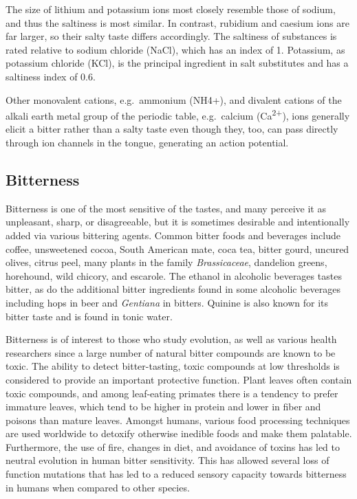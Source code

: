 The size of lithium and potassium ions most closely resemble those of sodium, and thus the saltiness is most similar. In contrast, rubidium and caesium ions are far larger, so their salty taste differs accordingly. The saltiness of substances is rated relative to sodium chloride (NaCl), which has an index of 1. Potassium, as potassium chloride (KCl), is the principal ingredient in salt substitutes and has a saltiness index of 0.6.

Other monovalent cations, e.g.~ammonium (NH4+), and divalent cations of the alkali earth metal group of the periodic table, e.g.~calcium (Ca\textsuperscript{2+}), ions generally elicit a bitter rather than a salty taste even though they, too, can pass directly through ion channels in the tongue, generating an action potential.

\hypertarget{bitterness}{%
\subsection{Bitterness}\label{bitterness}}

Bitterness is one of the most sensitive of the tastes, and many perceive it as unpleasant, sharp, or disagreeable, but it is sometimes desirable and intentionally added via various bittering agents. Common bitter foods and beverages include coffee, unsweetened cocoa, South American mate, coca tea, bitter gourd, uncured olives, citrus peel, many plants in the family \emph{Brassicaceae}, dandelion greens, horehound, wild chicory, and escarole. The ethanol in alcoholic beverages tastes bitter, as do the additional bitter ingredients found in some alcoholic beverages including hops in beer and \emph{Gentiana} in bitters. Quinine is also known for its bitter taste and is found in tonic water.

Bitterness is of interest to those who study evolution, as well as various health researchers since a large number of natural bitter compounds are known to be toxic. The ability to detect bitter-tasting, toxic compounds at low thresholds is considered to provide an important protective function. Plant leaves often contain toxic compounds, and among leaf-eating primates there is a tendency to prefer immature leaves, which tend to be higher in protein and lower in fiber and poisons than mature leaves. Amongst humans, various food processing techniques are used worldwide to detoxify otherwise inedible foods and make them palatable. Furthermore, the use of fire, changes in diet, and avoidance of toxins has led to neutral evolution in human bitter sensitivity. This has allowed several loss of function mutations that has led to a reduced sensory capacity towards bitterness in humans when compared to other species.

